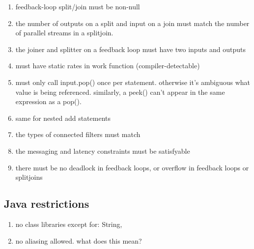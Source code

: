 \begin{enumerate}

\item feedback-loop split/join must be non-null

\item the number of outputs on a split and input on a join must match the number of parallel streams in a splitjoin.

\item the joiner and splitter on a feedback loop must have two inputs and outputs

\item must have static rates in work function (compiler-detectable)

\item must only call input.pop() once per statement.  otherwise it's
ambiguous what value is being referenced.  similarly, a peek() can't
appear in the same expression as a pop().

\item same for nested add statements

\item the types of connected filters must match

\item the messaging and latency constraints must be satisfyable

\item there must be no deadlock in feedback loops, or overflow in feedback loops or splitjoins

\end{enumerate}

\subsection{Java restrictions}

\begin{enumerate}

\item no class libraries except for:  String,

\item no aliasing allowed.  what does this mean?

\end{enumerate}



